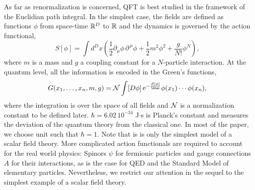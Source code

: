 \documentclass[10pt,here,feynmf]{article}
\begin{document}
As far as renormalization is concerned, QFT is best studied in the framework of the Euclidian path integral. In the simplest case, the fields are defined as functions $\phi$ from space-time ${\Bbb R}^{D}$ to ${\Bbb R}$ and the dynamics is governed by the action functional,
\begin{equation}
S[ \phi]=\int d^{D}x
\left(\frac{1}{2}\partial_{\mu}\phi\,\partial^{\,\mu}\phi+
\frac{1}{2}{m}^{2}\phi^{2}+
\frac{g}{N!}\phi^{N}\right),
\end{equation} 
where $m$ is a mass and $g$ a coupling constant for a $N$-particle interaction. At the quantum level, all the information is encoded in the Green's functions,
\begin{equation}
G(x_{1},\dots,x_{n},m,g)={\cal N}
\int[D\phi]\,\mathrm{e}^{-\frac{\cal{S}[ \phi]}{\hbar}}\phi(x_{1})\cdots\phi(x_{n}),\label{green}
\end{equation}
where the integration is over the space of all fields and ${}\cal N$ is a normalization constant to be defined later.  $\hbar=6.02\,10^{-34}$ J$\cdot$s is Planck's constant and measures the deviation of the quantum theory from the classical one. In most of the paper, we choose unit such that $\hbar=1$. Note that is is only the simplest model of a scalar field theory. More complicated action functionals are required to account for the real world physics: Spinors $\psi$ for fermionic particles and gauge connections $A$ for their interactions, as is the case for QED and the Standard Model of elementary particles. Nevertheless, we restrict our attention in the sequel to the simplest example of a scalar field theory.  
\end{document}
